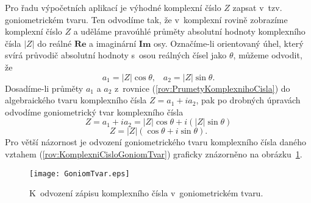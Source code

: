 Pro řadu výpočetních aplikací je výhodné komplexní číslo $Z$ zapsat v~tzv. goniometrickém tvaru. Ten odvodíme tak, že v~komplexní rovině zobrazíme komplexní číslo $Z$ a uděláme pravoúhlé průměty absolutní hodnoty komplexního čísla $|Z|$ do reálné $\mathbf{Re}$ a imaginární $\mathbf{Im}$ osy. Označíme-li orientovaný úhel, který svírá průvodič absolutní hodnoty s~osou reálných čísel jako $\theta$, můžeme odvodit, že 
\begin{equation}
a_1 = |Z| \cos \theta \mbox{,} \quad a_2 = |Z| \sin \theta \mbox{.}
\label{rov:PrumetyKomplexnihoCisla}
\end{equation}
Dosadíme-li průměty $a_1$ a $a_2$ z~rovnice (\ref{rov:PrumetyKomplexnihoCisla}) do algebraického tvaru komplexního čísla $Z = a_1 + ia_2$, pak po drobných úpravách odvodíme goniometrický tvar komplexního čísla
\begin{displaymath}
Z = a_1 + ia_2 = |Z| \cos \theta + i (|Z| \sin \theta)
\end{displaymath}
\begin{equation}
Z = |Z| (\cos \theta + i\sin \theta) \mbox{.}
\label{rov:KomplexniCisloGoniomTvar}
\end{equation}
Pro větší názornost je odvození goniometrického tvaru komplexního čísla daného vztahem (\ref{rov:KomplexniCisloGoniomTvar}) graficky znázorněno na obrázku~\ref{obr:GoniometrickyTvar}.
\begin{figure} [ht]
\centering
\texttt{[image: GoniomTvar.eps]}
\caption[Goniometrický tvar komplexního čísla]{K~odvození zápisu komplexního čísla v~goniometrickém tvaru.}
\label{obr:GoniometrickyTvar}
\end{figure}

